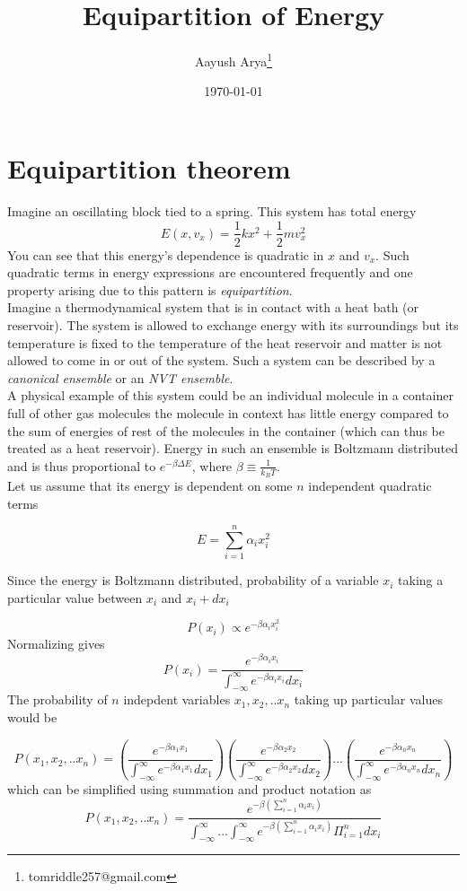\documentclass{article}
\title{Equipartition of Energy}
\date{\today}
\author{Aayush Arya\footnote{tomriddle257@gmail.com}}
\begin{document}
	\maketitle

	\section{Equipartition theorem}
	Imagine an oscillating block tied to a spring. This system has total energy $$ E(x,v_x) = \frac{1}{2}kx^2 + \frac{1}{2}mv_x^2$$
	You can see that this energy's dependence is quadratic in $x$ and $v_x$. Such quadratic terms in energy expressions are encountered frequently and one property arising due to this pattern is \textit{equipartition}.\\
	
	Imagine a thermodynamical system that is in contact with a heat bath (or reservoir). The system is allowed to exchange energy with its surroundings but its temperature is fixed to the temperature of the heat reservoir and matter is not allowed to come in or out of the system. Such a system can be described by a \textit{canonical ensemble} or an \textit{NVT ensemble}.\\
	
	A physical example of this system could be an individual molecule in a container full of other gas molecules \textemdash the molecule in context has little energy compared to the sum of energies of rest of the molecules in the container (which can thus be treated as a heat reservoir). Energy in such an ensemble is Boltzmann distributed and is thus proportional to $e^{-\beta\Delta E}$, where $\beta \equiv  \frac{1}{k_B T}$.\\
	Let us assume that its energy is dependent on some $n$ independent quadratic terms
	
	$$ E = \sum_{i=1}^{n}\alpha_ix_i^2$$
	
	Since the energy is Boltzmann distributed, probability of a variable $x_i$ taking a particular value between $x_i$ and $x_i + dx_i$
	
	$$ P(x_i) \propto e^{-\beta \alpha_i x_i^2}$$
	Normalizing gives
	$$ P(x_i) = \frac{e^{-\beta\alpha_i x_i}}{\int_{-\infty}^{\infty} e^{-\beta\alpha_i x_i} dx_i}$$
	The probability of $n$ indepdent variables $x_1, x_2, .. x_n$ taking up particular values would be
	
	$$ P(x_1, x_2, .. x_n) = \left(\frac{e^{-\beta\alpha_1 x_1}}{\int_{-\infty}^{\infty} e^{-\beta\alpha_1 x_1} dx_1}\right) \left(\frac{e^{-\beta\alpha_2 x_2}}{\int_{-\infty}^{\infty} e^{-\beta\alpha_2 x_2} dx_2}\right) ... \left(\frac{e^{-\beta\alpha_n x_n}}{\int_{-\infty}^{\infty} e^{-\beta\alpha_n x_n} dx_n}\right) $$
	which can be simplified using summation and product notation as
	$$ P(x_1, x_2, .. x_n) =  \frac{e^{-\beta (\sum_{i=1}^{n} \alpha_i x_i)}}{\int_{-\infty}^{\infty} ... {\int_{-\infty}^{\infty} e^{-\beta (\sum_{i=1}^{n} \alpha_i x_i)}} \Pi_{i=1}^{n}dx_i}$$
	
\end{document}
